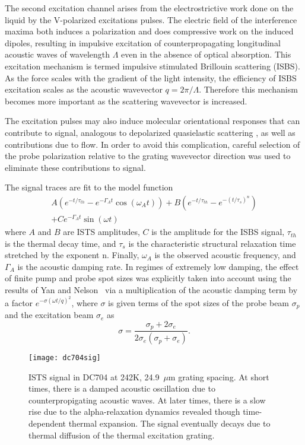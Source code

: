 \documentclass[reprint,showpacs,amsmath,amssymb,aip,jcp]{revtex4-1}
\begin{document}
The second excitation channel arises from the electrostrictive work
done on the liquid by the V-polarized excitations pulses. The electric
field of the interference maxima both induces a polarization and does
compressive work on the induced dipoles, resulting in impulsive
excitation of counterpropagating longitudinal acoustic waves of
wavelength $\Lambda$ even in the absence of optical absorption. This
excitation mechanism is termed impulsive stimulated Brillouin
scattering (ISBS). As the force scales with the gradient of the light
intensity, the efficiency of ISBS excitation scales as the acoustic
wavevector $q=2\pi/\Lambda$. Therefore this mechanism becomes more
important as the scattering wavevector is increased.

The excitation pulses may also induce molecular orientational
responses that can contribute to signal, analogous to depolarized
quasielastic scattering \cite{sSilence1992,sHinze2000}, as well as
contributions due to flow. In order to avoid this complication,
careful selection of the probe polarization relative to the grating
wavevector direction was used to eliminate these contributions to
signal.

The signal traces are fit to the model function~\cite{sYang1995}
\begin{multline}\label{eq:5gsol}
  A(e^{-t/\tau_{th}}-e^{-\Gamma_A t}\cos(\omega_A
  t))+B(e^{-t/\tau_{th}}-e^{-(t/\tau_s)^n})\\
  +Ce^{-\Gamma_A t}\sin(\omega t)
\end{multline}
where $A$ and $B$ are ISTS amplitudes, $C$ is the amplitude for the
ISBS signal, $\tau_{th}$ is the thermal decay time, and $\tau_s$ is
the characteristic structural relaxation time stretched by the
exponent n. Finally, $\omega_A$ is the observed acoustic
frequency, and $\Gamma_A$ is the acoustic damping rate. In regimes of
extremely low damping, the effect of finite pump and probe spot sizes
was explicitly taken into account using the results of Yan and
Nelson~\cite{sYan1987a} via a multiplication of the acoustic damping
term by a factor $e^{-\sigma(\omega t/q)^2}$, where $\sigma$ is given
terms of the spot sizes of the probe beam $\sigma_p$ and the
excitation beam $\sigma_e$ as
\begin{equation}
  \sigma=\frac{\sigma_{p}+2\sigma_e}{2\sigma_e\left(\sigma_p+\sigma_e\right)}.
\end{equation}

\begin{figure}
  \centering
  \texttt{[image: dc704sig]}
  \caption[Longitudinal Signal with fit]{\label{fig:dc704lsig}ISTS
    signal in DC704 at 242K, 24.9~$\mu$m grating spacing. At short
    times, there is a damped acoustic oscillation due to
    counterpropigating acoustic waves. At later times, there is a slow
    rise due to the alpha-relaxation dynamics revealed though
    time-dependent thermal expansion. The signal eventually decays due
    to thermal diffusion of the thermal excitation grating.}
\end{figure}
\end{document}
